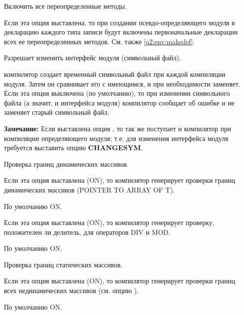 \begin{description}
        \MLBegin{}\ModeB{}\MLEnd{}

\nopagebreak
Включить все переопределенные методы.

Если эта опция выставлена, то при создании псевдо-определяющего модуля
в декларацию каждого типа записи будут включены первоначальные
декларации всех ее переопределенных методов.
См. также \ref{o2:env:makedef}.

        \MLBegin{}\ModeC{}\MLEnd{} \header

Разрешает изменить интерфейс модуля (символьный файл).

\ot{} компилятор создает временный символьный файл при каждой
компиляции \ot{} модуля. Затем он сравнивает его с имеющимся,
и при необходимости заменяет. Если эта опция выключена
(по умолчанию), то при изменении символьного файла (а значит, и 
интерфейса модуля) компилятор сообщает об ошибке и не заменяет 
старый символьный файл.

{\bf  Замечание:}  Если выставлена опция ,
то так же поступает и \mt{} компилятор при компиляции 
определяющего модуля; т.е. для изменения интерфейса модуля 
требуется выставить опцию {\bf CHANGESYM}.

        \MLBegin{}\ModeC{}\MLEnd{} \inline

Проверка границ динамических массивов.

Если эта опция выставлена (ON), то компилятор генерирует проверки границ
динамических массивов (POINTER TO ARRAY OF T).

По умолчанию ON.

        \MLBegin{}\ModeC{}\MLEnd{} \inline

Если эта опция выставлена (ON), то компилятор генерирует проверку,
положителен ли делитель, для операторов DIV и MOD.

По умолчанию ON.

        \MLBegin{}\ModeC{}\MLEnd{} \inline

Проверка границ статических массивов.

Если эта опция выставлена (ON), то компилятор генерирует проверки границ
всех нединамических массивов (см. опцию ).

По умолчанию ON.


\end{description}
